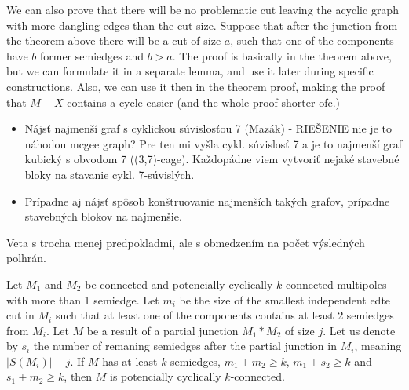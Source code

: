 \documentclass[12pt, twoside]{book}
\begin{document}
\todo{}We can also prove that there will be no problematic cut leaving the acyclic graph with more dangling edges than the cut size. Suppose that after the junction from the theorem above there will be a cut of size $a$, such that one of the components have $b$ former semiedges and $b>a$. The proof is basically in the theorem above, but we can formulate it in a separate lemma, and use it later during specific constructions. Also, we can use it then in the theorem proof, making the proof that $M-X$ contains a cycle easier (and the whole proof shorter ofc.)

\begin{itemize}
	\item Nájsť najmenší graf s cyklickou súvislosťou 7 (Mazák) - RIEŠENIE nie je to náhodou mcgee graph? Pre ten mi vyšla cykl. súvislosť 7 a je to najmenší graf kubický s obvodom 7 ((3,7)-cage). Každopádne viem vytvoriť nejaké stavebné bloky na stavanie cykl. 7-súvislých.
	\item Prípadne aj nájsť spôsob konštruovanie najmenších takých grafov, prípadne stavebných blokov na najmenšie.
\end{itemize}

Veta s trocha menej predpokladmi, ale s obmedzením na počet výsledných polhrán.
\begin{theorem}\label{th:connecting-potencially-cyclically-connected-with-number-of-resulting-semiedges}
	Let $M_1$ and $M_2$ be connected and potencially cyclically $k$-connected multipoles with more than 1 semiedge. Let $m_i$ be the size of the smallest independent edte cut in $M_i$ such that at least one of the components contains at least 2 semiedges from $M_i$. Let $M$ be a result of a partial junction $M_1*M_2$ of size $j$. Let us denote by $s_i$ the number of remaning semiedges after the partial junction in $M_i$, meaning $|S(M_i)|-j$. If $M$ has at least $k$ semiedges, $m_1+m_2\geq k$, $m_1+s_2\geq k$ and $s_1+m_2\geq k$, then $M$ is potencially cyclically $k$-connected.
\end{theorem}
\end{document}
